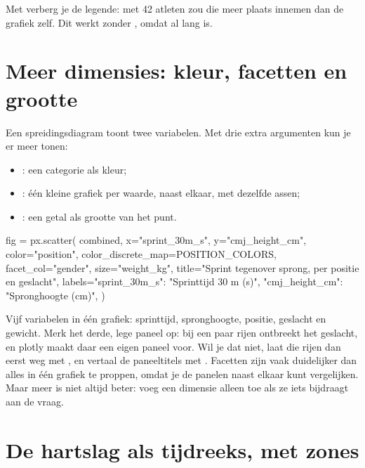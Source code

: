 \documentclass[11pt,a4paper]{article}
\begin{document}
Met  verberg je de legende: met 42
atleten zou die meer plaats innemen dan de grafiek zelf. Dit werkt zonder
, omdat  al lang is.

\section{Meer dimensies: kleur, facetten en grootte}

Een spreidingsdiagram toont twee variabelen. Met drie extra argumenten
kun je er meer tonen:

\begin{itemize}
  \item {}: een categorie als kleur;
  \item {}: één kleine grafiek per waarde, naast
        elkaar, met dezelfde assen;
  \item {}: een getal als grootte van het punt.
\end{itemize}

\begin{python}[fig=facet]
fig = px.scatter(
    combined, x="sprint_30m_s", y="cmj_height_cm",
    color="position", color_discrete_map=POSITION_COLORS,
    facet_col="gender", size="weight_kg",
    title="Sprint tegenover sprong, per positie en geslacht",
    labels={"sprint_30m_s": "Sprinttijd 30 m (s)", "cmj_height_cm": "Spronghoogte (cm)"},
)
\end{python}

Vijf variabelen in één grafiek: sprinttijd, spronghoogte, positie,
geslacht en gewicht. Merk het derde, lege paneel  op:
bij een paar rijen ontbreekt het geslacht, en plotly maakt daar een eigen
paneel voor. Wil je dat niet, laat die rijen dan eerst weg met
, en vertaal de paneeltitels
met . Facetten zijn vaak duidelijker dan alles in één
grafiek te proppen, omdat je de panelen naast elkaar kunt vergelijken.
Maar meer is niet altijd beter: voeg een dimensie alleen toe als ze iets
bijdraagt aan de vraag.

\section{De hartslag als tijdreeks, met zones}
\end{document}
